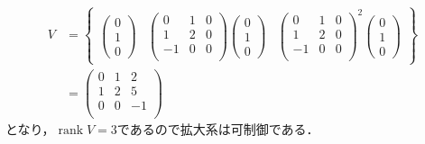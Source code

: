 \documentclass[10pt]{beamer}
\begin{document}
\begin{frame}[t]
\begin{align}
 V &=
 \left\{
 \begin{array}{ccc}
 \left(
 \begin{array}{c}
  0 \\
  1 \\
  0
 \end{array}
 \right) &
 \left(
 \begin{array}{ccc}
  0 & 1 & 0 \\
  1 & 2 & 0 \\
  -1 & 0 & 0 \\
 \end{array}
 \right)
 \left(
 \begin{array}{c}
  0 \\
  1 \\
  0
 \end{array}
 \right) &
 \left(
 \begin{array}{ccc}
  0 & 1 & 0 \\
  1 & 2 & 0 \\
  -1 & 0 & 0 \\
 \end{array}
 \right)^2
 \left(
 \begin{array}{c}
  0 \\
  1 \\
  0
 \end{array}
 \right)
 \end{array}
 \right\} \nonumber\\&=
 \left(
 \begin{array}{ccc}
  0 & 1 & 2 \\
  1 & 2 & 5 \\
  0 & 0 & -1 \\
 \end{array}
 \right)\nonumber
\end{align}
となり，$\operatorname{rank} V = 3$であるので拡大系は可制御である．
\end{frame}
\end{document}
